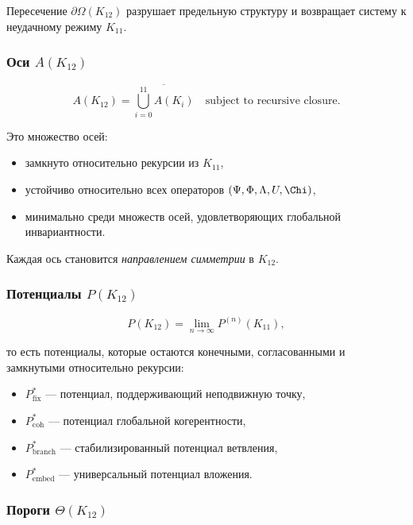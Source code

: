 Пересечение $\partial\Omega(K_{12})$ разрушает предельную структуру и
возвращает систему к неудачному режиму $K_{11}$.

\subsubsection{Оси $A(K_{12})$}

\[
A(K_{12}) =
\overline{\bigcup_{i=0}^{11} A(K_i)}
\quad \text{subject to recursive closure}.
\]

Это множество осей:
\begin{itemize}
    \item замкнуто относительно рекурсии из $K_{11}$,
    \item устойчиво относительно всех операторов $(\Psi,\Phi,\Lambda,U,\Chi)$,
    \item минимально среди множеств осей, удовлетворяющих глобальной
          инвариантности.
\end{itemize}

Каждая ось становится \emph{направлением симметрии} в $K_{12}$.

\subsubsection{Потенциалы $P(K_{12})$}

\[
P(K_{12}) = \lim_{n\to\infty} P^{(n)}(K_{11}),
\]

то есть потенциалы, которые остаются конечными, согласованными и замкнутыми
относительно рекурсии:
\begin{itemize}
    \item $P_{\mathrm{fix}}^*$ — потенциал, поддерживающий неподвижную точку,
    \item $P_{\mathrm{coh}}^*$ — потенциал глобальной когерентности,
    \item $P_{\mathrm{branch}}^*$ — стабилизированный потенциал ветвления,
    \item $P_{\mathrm{embed}}^*$ — универсальный потенциал вложения.
\end{itemize}

\subsubsection{Пороги $\Theta(K_{12})$}

